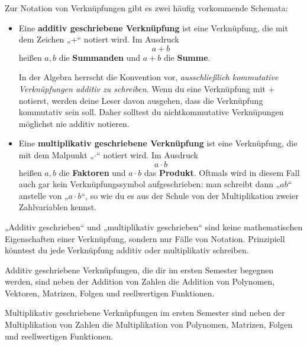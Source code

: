 \begin{nota}  
    Zur Notation von Verknüpfungen gibt es zwei häufig vorkommende Schemata:
    \begin{itemize}
        \item Eine \textbf{additiv geschriebene Verknüpfung} ist eine Verknüpfung, die mit dem Zeichen „$+$“ notiert wird. Im Ausdruck
            \[ a + b\]
        heißen $a,b$ die \textbf{Summanden} und $a+b$ die \textbf{Summe}.
        
        In der Algebra herrscht die Konvention vor, \emph{ausschließlich kommutative Verknüpfungen additiv zu schreiben}. Wenn du eine Verknüpfung mit $+$ notierst, werden deine Leser davon ausgehen, dass die Verknüpfung kommutativ sein soll. Daher solltest du nichtkommutative Verknüpungen möglichst nie additiv notieren.
        \item Eine \textbf{multiplikativ geschriebene Verknüpfung} ist eine Verknüpfung, die mit dem Malpunkt „$\cdot$“ notiert wird. Im Ausdruck
            \[ a\cdot b \]
        heißen $a,b$ die \textbf{Faktoren} und $a\cdot b$ das \textbf{Produkt}. Oftmals wird in diesem Fall auch gar kein Verknüpfungssymbol aufgeschrieben: man schreibt dann „$ab$“ anstelle von „$a\cdot b$“, so wie du es aus der Schule von der Multiplikation zweier Zahlvariablen kennst.
    \end{itemize}
    „Additiv geschrieben“ und „multiplikativ geschrieben“ sind keine mathematischen Eigenschaften einer Verknüpfung, sondern nur Fälle von Notation. Prinzipiell könntest du jede Verknüpfung additiv oder multiplikativ schreiben.
\end{nota}


\begin{bsp}
    Additiv geschriebene Verknüpfungen, die dir im ersten Semester begegnen werden, sind neben der Addition von Zahlen die Addition von Polynomen, Vektoren, Matrizen, Folgen und reellwertigen Funktionen.
    
    Multiplikativ geschriebene Verknüpfungen im ersten Semester sind neben der Multiplikation von Zahlen die Multiplikation von Polynomen, Matrizen, Folgen und reellwertigen Funktionen.
\end{bsp}


